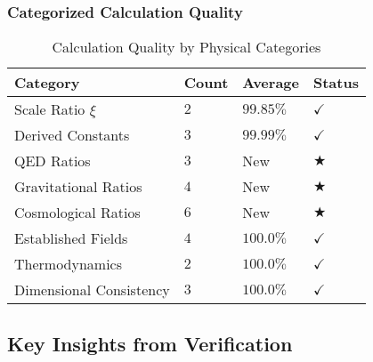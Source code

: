 \documentclass[12pt,a4paper]{article}
\newcommand{\xipar}{\xi}
\newcommand{\checked}{\checkmark}
\begin{document}
	\subsubsection{Categorized Calculation Quality}
	\label{subsubsec:categorized_quality}
	
	\begin{table}[H]
		\centering
		\caption{Calculation Quality by Physical Categories}
		\label{tab:quality_by_category}
		\begin{tabular}{p{5cm}p{1.5cm}p{2.5cm}p{1.5cm}}
			\toprule
			\textbf{Category} & \textbf{Count} & \textbf{Average} & \textbf{Status} \\
			\midrule
			Scale Ratio $\xipar$ & $2$ & $99.85\%$ & $\checked$ \\
			Derived Constants & $3$ & $99.99\%$ & $\checked$ \\
			QED Ratios & $3$ & New & $\bigstar$ \\
			Gravitational Ratios & $4$ & New & $\bigstar$ \\
			Cosmological Ratios & $6$ & New & $\bigstar$ \\
			Established Fields & $4$ & $100.0\%$ & $\checked$ \\
			Thermodynamics & $2$ & $100.0\%$ & $\checked$ \\
			Dimensional Consistency & $3$ & $100.0\%$ & $\checked$ \\
			\bottomrule
		\end{tabular}
	\end{table}
	
	\subsection{Key Insights from Verification}
	\label{subsec:key_insights}
	
\end{document}
